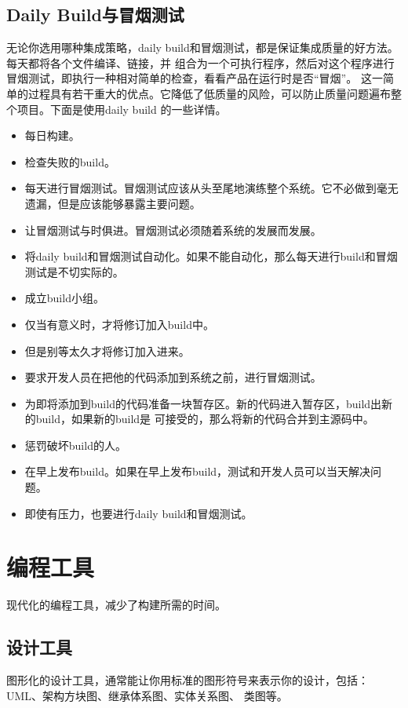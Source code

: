 \documentclass{article}
\begin{document}
\subsection{Daily Build与冒烟测试}
无论你选用哪种集成策略，daily build和冒烟测试，都是保证集成质量的好方法。每天都将各个文件编译、链接，并
组合为一个可执行程序，然后对这个程序进行冒烟测试，即执行一种相对简单的检查，看看产品在运行时是否“冒烟”。
这一简单的过程具有若干重大的优点。它降低了低质量的风险，可以防止质量问题遍布整个项目。下面是使用daily build
的一些详情。
\begin{itemize}
    \item 每日构建。
    \item 检查失败的build。
    \item 每天进行冒烟测试。冒烟测试应该从头至尾地演练整个系统。它不必做到毫无遗漏，但是应该能够暴露主要问题。
    \item 让冒烟测试与时俱进。冒烟测试必须随着系统的发展而发展。
    \item 将daily build和冒烟测试自动化。如果不能自动化，那么每天进行build和冒烟测试是不切实际的。
    \item 成立build小组。
    \item 仅当有意义时，才将修订加入build中。
    \item 但是别等太久才将修订加入进来。
    \item 要求开发人员在把他的代码添加到系统之前，进行冒烟测试。
    \item 为即将添加到build的代码准备一块暂存区。新的代码进入暂存区，build出新的build，如果新的build是
    可接受的，那么将新的代码合并到主源码中。
    \item 惩罚破坏build的人。
    \item 在早上发布build。如果在早上发布build，测试和开发人员可以当天解决问题。
    \item 即使有压力，也要进行daily build和冒烟测试。
\end{itemize}

\section{编程工具}
现代化的编程工具，减少了构建所需的时间。
\subsection{设计工具}
图形化的设计工具，通常能让你用标准的图形符号来表示你的设计，包括：UML、架构方块图、继承体系图、实体关系图、
类图等。
\end{document}
